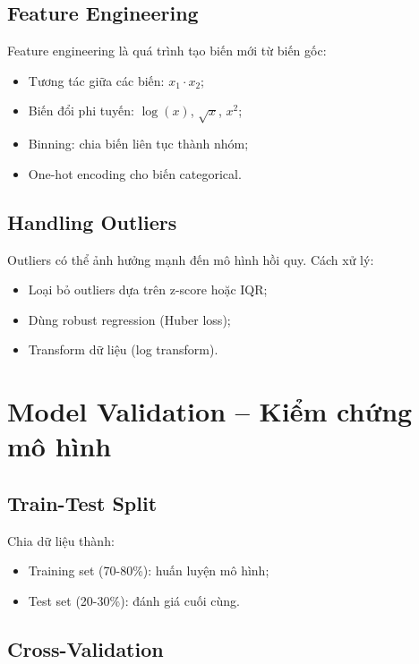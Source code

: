 \subsection{Feature Engineering}

Feature engineering là quá trình tạo biến mới từ biến gốc:
\begin{itemize}
    \item Tương tác giữa các biến: $x_1 \cdot x_2$;
    \item Biến đổi phi tuyến: $\log(x)$, $\sqrt{x}$, $x^2$;
    \item Binning: chia biến liên tục thành nhóm;
    \item One-hot encoding cho biến categorical.
\end{itemize}

\subsection{Handling Outliers}

Outliers có thể ảnh hưởng mạnh đến mô hình hồi quy. Cách xử lý:
\begin{itemize}
    \item Loại bỏ outliers dựa trên z-score hoặc IQR;
    \item Dùng robust regression (Huber loss);
    \item Transform dữ liệu (log transform).
\end{itemize}

\section{Model Validation -- Kiểm chứng mô hình}

\subsection{Train-Test Split}

Chia dữ liệu thành:
\begin{itemize}
    \item Training set (70-80\%): huấn luyện mô hình;
    \item Test set (20-30\%): đánh giá cuối cùng.
\end{itemize}

\subsection{Cross-Validation}

